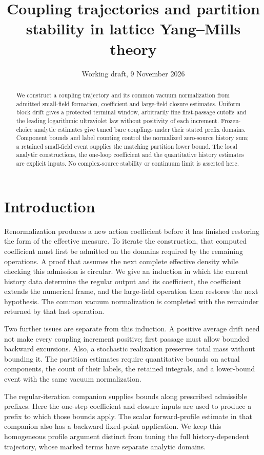 \documentclass[11pt,letterpaper,reqno]{amsart}
\title[Trajectory and partition stability]{Coupling trajectories and partition stability in lattice Yang--Mills theory}
\date{Working draft, 9 November 2026}
\numberwithin{equation}{section}
\theoremstyle{definition}
\theoremstyle{remark}
\begin{document}
\raggedbottom
\begin{abstract}
We construct a coupling trajectory and its common vacuum normalization
from admitted small-field formation, coefficient and large-field
closure estimates. Uniform block drift gives a protected terminal
window, arbitrarily fine first-passage cutoffs and the leading
logarithmic ultraviolet law without positivity of each increment.
Frozen-choice analytic estimates give tuned bare couplings under
their stated prefix domains. Component bounds and label counting
control the normalized zero-source history sum; a retained
small-field event supplies the matching partition lower bound.
The local analytic constructions, the one-loop coefficient and
the quantitative history estimates are explicit inputs. No
complex-source stability or continuum limit is asserted here.
\end{abstract}
\maketitle
\tableofcontents

\section{Introduction}

Renormalization produces a new action coefficient before it has
finished restoring the form of the effective measure. To iterate
the construction, that computed coefficient must first be admitted
on the domains required by the remaining operations. A proof that
assumes the next complete effective density while checking this
admission is circular. We give an induction in which the current
history data determine the regular output and its coefficient,
the coefficient extends the numerical frame, and the large-field
operation then restores the next hypothesis. The common vacuum
normalization is completed with the remainder returned by that
last operation.

Two further issues are separate from this induction. A positive
average drift need not make every coupling increment positive;
first passage must allow bounded backward excursions. Also, a
stochastic realization preserves total mass without bounding it.
The partition estimates require quantitative bounds on actual
components, the count of their labels, the retained integrals,
and a lower-bound event with the same vacuum normalization.

The regular-iteration companion \cite{EM} supplies bounds along
prescribed admissible prefixes. Here the one-step coefficient
and closure inputs are used to produce a prefix to which those
bounds apply. The scalar forward-profile estimate in that
companion also has a backward fixed-point application. We keep
this homogeneous profile argument distinct from tuning the full
history-dependent trajectory, whose marked terms have separate
analytic domains.
\end{document}
